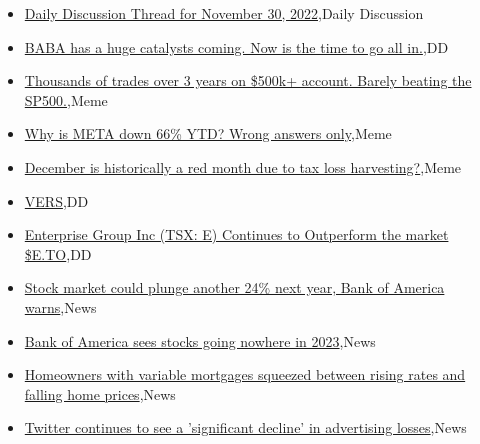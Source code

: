 \documentclass{article}%
\begin{document}
%
\begin{itemize}%
\item%
\href{https://reddit.com/r/wallstreetbets/comments/z8om96/daily\_discussion\_thread\_for\_november\_30\_2022/}{Daily Discussion Thread for November 30, 2022},Daily Discussion%
\item%
\href{https://reddit.com/r/wallstreetbets/comments/z8mj92/baba\_has\_a\_huge\_catalysts\_coming\_now\_is\_the\_time/}{BABA has a huge catalysts coming. Now is the time to go all in.},DD%
\item%
\href{https://reddit.com/r/wallstreetbets/comments/z8ignq/thousands\_of\_trades\_over\_3\_years\_on\_500k\_account/}{Thousands of trades over 3 years on \$500k+ account. Barely beating the SP500.},Meme%
\item%
\href{https://reddit.com/r/wallstreetbets/comments/z8g73h/why\_is\_meta\_down\_66\_ytd\_wrong\_answers\_only/}{Why is META down 66\% YTD? Wrong answers only},Meme%
\item%
\href{https://reddit.com/r/wallstreetbets/comments/z8fwdo/december\_is\_historically\_a\_red\_month\_due\_to\_tax/}{December is historically a red month due to tax loss harvesting?},Meme%
\item%
\href{https://reddit.com/r/Baystreetbets/comments/z88jmu/vers/}{VERS},DD%
\item%
\href{https://reddit.com/r/Baystreetbets/comments/z7wp06/enterprise\_group\_inc\_tsx\_e\_continues\_to/}{Enterprise Group Inc (TSX: E) Continues to Outperform the market \$E.TO},DD%
\item%
\href{https://reddit.com/r/StockMarket/comments/z8i1zv/stock\_market\_could\_plunge\_another\_24\_next\_year/}{Stock market could plunge another 24\% next year, Bank of America warns},News%
\item%
\href{https://reddit.com/r/StockMarket/comments/z8hb43/bank\_of\_america\_sees\_stocks\_going\_nowhere\_in\_2023/}{Bank of America sees stocks going nowhere in 2023},News%
\item%
\href{https://reddit.com/r/Economics/comments/z8oi8y/homeowners\_with\_variable\_mortgages\_squeezed/}{Homeowners with variable mortgages squeezed between rising rates and falling home prices},News%
\item%
\href{https://reddit.com/r/Economics/comments/z8hvcl/twitter\_continues\_to\_see\_a\_significant\_decline\_in/}{Twitter continues to see a 'significant decline' in advertising losses},News%
\end{itemize}%
\end{document}
